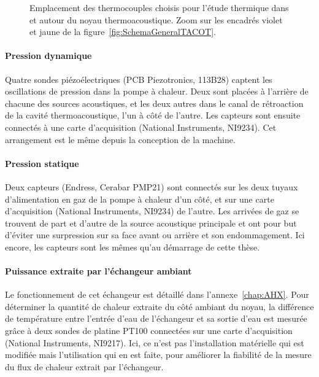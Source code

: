 \begin{figure}[!ht]
    \centering
    
    \caption{Emplacement des thermocouples choisis pour l'étude thermique dans et autour du noyau thermoacoustique. Zoom sur les encadrés violet et jaune de la figure~\ref{fig:SchemaGeneralTACOT}. }
    \label{fig:TCdansNoyau}
\end{figure}

\paragraph{Pression dynamique} Quatre sondes piézoélectriques (PCB Piezotronics, 113B28) captent les oscillations de pression dans la pompe à chaleur. Deux sont placées à l'arrière de chacune des sources acoustiques, et les deux autres dans le canal de rétroaction de la cavité thermoacoustique, l'un à côté de l'autre. Les capteurs sont ensuite connectés à une carte d'acquisition (National Instruments, NI9234). Cet arrangement est le même depuis la conception de la machine.

\paragraph{Pression statique} Deux capteurs (Endress, Cerabar PMP21) sont connectés sur les deux tuyaux d'alimentation en gaz de la pompe  à chaleur d'un côté, et sur une carte d'acquisition (National Instruments, NI9234) de l'autre. Les arrivées de gaz se trouvent de part et d'autre de la source acoustique principale et ont pour but d'éviter une surpression sur sa face avant ou arrière et son endommagement. Ici encore, les capteurs sont les mêmes qu'au démarrage de cette thèse.

\paragraph{Puissance extraite par l'échangeur ambiant} Le fonctionnement de cet échangeur est détaillé dans l'annexe~\ref{chap:AHX}. Pour déterminer la quantité de chaleur extraite du côté ambiant du noyau, la différence de température entre l'entrée d'eau de l'échangeur et sa sortie d'eau est mesurée grâce à deux sondes de platine PT100 connectées sur une carte d'acquisition (National Instruments, NI9217). Ici, ce n'est pas l'installation matérielle qui est modifiée mais l'utilisation qui en est faite, pour améliorer la fiabilité de la mesure du flux de chaleur extrait par l'échangeur.

